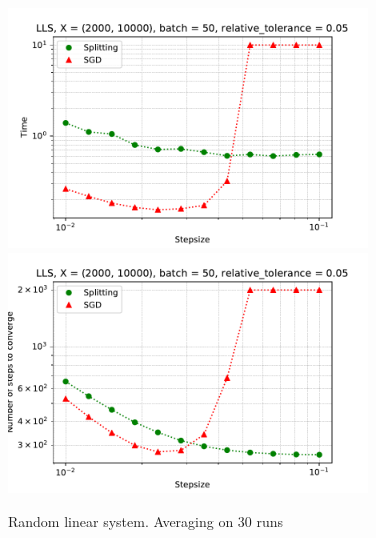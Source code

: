 \documentclass{article}
\begin{document}
\begin{figure}
\includegraphics[width=0.85\textwidth]{sgd_split_iterations_lls.pdf} \\
\includegraphics[width=0.85\textwidth]{sgd_split_time_lls.pdf}

\caption{Random linear system. Averaging on 30 runs}
\end{figure}
\end{document}
